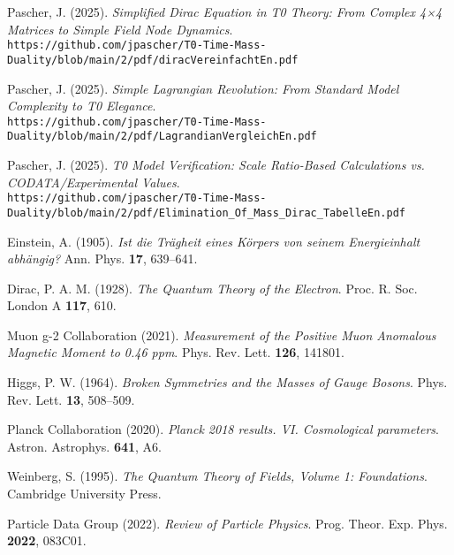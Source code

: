 \documentclass[12pt,a4paper]{article}
\theoremstyle{definition}
\theoremstyle{remark}
\begin{document}
															\begin{thebibliography}{99}
																Pascher, J. (2025). \textit{Simplified Dirac Equation in T0 Theory: From Complex 4×4 Matrices to Simple Field Node Dynamics}. \\
																\texttt{https://github.com/jpascher/T0-Time-Mass-Duality/blob/main/2/pdf/diracVereinfachtEn.pdf}
																
																Pascher, J. (2025). \textit{Simple Lagrangian Revolution: From Standard Model Complexity to T0 Elegance}. \\
																\texttt{https://github.com/jpascher/T0-Time-Mass-Duality/blob/main/2/pdf/LagrandianVergleichEn.pdf}
																
																Pascher, J. (2025). \textit{T0 Model Verification: Scale Ratio-Based Calculations vs. CODATA/Experimental Values}. \\
																\texttt{https://github.com/jpascher/T0-Time-Mass-Duality/blob/main/2/pdf/Elimination\_Of\_Mass\_Dirac\_TabelleEn.pdf}
																
																Einstein, A. (1905). \textit{Ist die Trägheit eines Körpers von seinem Energieinhalt abhängig?} Ann. Phys. \textbf{17}, 639--641.
																
																Dirac, P. A. M. (1928). \textit{The Quantum Theory of the Electron}. Proc. R. Soc. London A \textbf{117}, 610.
																
																Muon g-2 Collaboration (2021). \textit{Measurement of the Positive Muon Anomalous Magnetic Moment to 0.46 ppm}. Phys. Rev. Lett. \textbf{126}, 141801.
																
																Higgs, P. W. (1964). \textit{Broken Symmetries and the Masses of Gauge Bosons}. Phys. Rev. Lett. \textbf{13}, 508--509.
																
																Planck Collaboration (2020). \textit{Planck 2018 results. VI. Cosmological parameters}. Astron. Astrophys. \textbf{641}, A6.
																
																Weinberg, S. (1995). \textit{The Quantum Theory of Fields, Volume 1: Foundations}. Cambridge University Press.
																
																Particle Data Group (2022). \textit{Review of Particle Physics}. Prog. Theor. Exp. Phys. \textbf{2022}, 083C01.
															\end{thebibliography}
															
														
\end{document}
